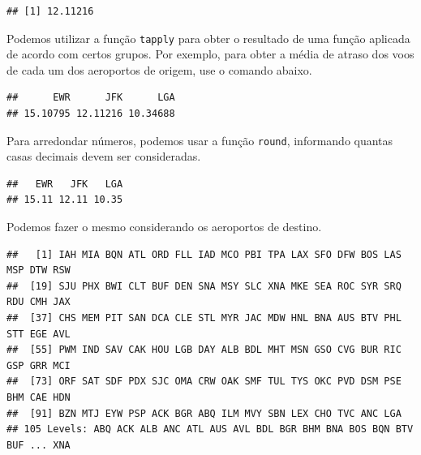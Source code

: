 \documentclass[
]{book}
\newenvironment{Shaded}{\begin{snugshade}}{\end{snugshade}}
\newcommand{\AttributeTok}[1]{\textcolor[rgb]{0.13,0.29,0.53}{#1}}
\newcommand{\ConstantTok}[1]{\textcolor[rgb]{0.56,0.35,0.01}{#1}}
\newcommand{\DecValTok}[1]{\textcolor[rgb]{0.00,0.00,0.81}{#1}}
\newcommand{\FunctionTok}[1]{\textcolor[rgb]{0.13,0.29,0.53}{\textbf{#1}}}
\newcommand{\NormalTok}[1]{#1}
\newcommand{\SpecialCharTok}[1]{\textcolor[rgb]{0.81,0.36,0.00}{\textbf{#1}}}
\begin{document}
\begin{verbatim}
## [1] 12.11216
\end{verbatim}

Podemos utilizar a função \texttt{tapply} para obter o resultado de uma função aplicada de acordo com certos grupos.
Por exemplo, para obter a média de atraso dos voos de cada um dos aeroportos de origem, use o comando abaixo.

\begin{Shaded}
\end{Shaded}

\begin{verbatim}
##      EWR      JFK      LGA 
## 15.10795 12.11216 10.34688
\end{verbatim}

Para arredondar números, podemos usar a função \texttt{round}, informando quantas casas decimais devem ser consideradas.

\begin{Shaded}
\end{Shaded}

\begin{verbatim}
##   EWR   JFK   LGA 
## 15.11 12.11 10.35
\end{verbatim}

Podemos fazer o mesmo considerando os aeroportos de destino.

\begin{Shaded}
\end{Shaded}

\begin{verbatim}
##   [1] IAH MIA BQN ATL ORD FLL IAD MCO PBI TPA LAX SFO DFW BOS LAS MSP DTW RSW
##  [19] SJU PHX BWI CLT BUF DEN SNA MSY SLC XNA MKE SEA ROC SYR SRQ RDU CMH JAX
##  [37] CHS MEM PIT SAN DCA CLE STL MYR JAC MDW HNL BNA AUS BTV PHL STT EGE AVL
##  [55] PWM IND SAV CAK HOU LGB DAY ALB BDL MHT MSN GSO CVG BUR RIC GSP GRR MCI
##  [73] ORF SAT SDF PDX SJC OMA CRW OAK SMF TUL TYS OKC PVD DSM PSE BHM CAE HDN
##  [91] BZN MTJ EYW PSP ACK BGR ABQ ILM MVY SBN LEX CHO TVC ANC LGA
## 105 Levels: ABQ ACK ALB ANC ATL AUS AVL BDL BGR BHM BNA BOS BQN BTV BUF ... XNA
\end{verbatim}
\end{document}
